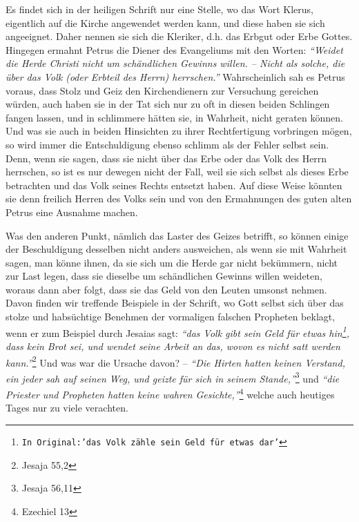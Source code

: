 Es findet sich in der heiligen Schrift nur eine Stelle, wo das Wort
Klerus,
eigentlich auf die Kirche angewendet werden kann, und diese haben sie sich
angeeignet. Daher nennen sie sich die Kleriker, d.h. das Erbgut oder Erbe
Gottes. Hingegen ermahnt Petrus die Diener des
Evangeliums mit den Worten:
\textit{"`Weidet die Herde Christi nicht um schändlichen Gewinns willen. --
Nicht
als solche, die über das Volk (oder Erbteil des Herrn) herrschen."'}
Wahrscheinlich sah es Petrus voraus, dass Stolz und Geiz den Kirchendienern zur
Versuchung gereichen würden, auch haben sie in der Tat sich nur zu oft in
diesen beiden Schlingen fangen lassen, und in schlimmere hätten sie, in
Wahrheit, nicht geraten können. Und was sie auch in beiden Hinsichten zu ihrer
Rechtfertigung vorbringen mögen, so wird immer die Entschuldigung ebenso
schlimm als der Fehler selbst sein. Denn, wenn sie sagen, dass sie nicht über
das
Erbe oder das Volk des Herrn herrschen, so ist es nur dewegen nicht der Fall,
weil sie sich selbst als dieses Erbe betrachten und das Volk seines Rechts
entsetzt haben. Auf diese Weise könnten sie denn freilich Herren des Volks sein
und von den Ermahnungen des guten alten Petrus eine Ausnahme machen.

\medskip

Was den anderen Punkt, nämlich das Laster des Geizes
betrifft, so können einige
der Beschuldigung desselben nicht anders ausweichen, als wenn sie mit Wahrheit
sagen, man könne ihnen, da sie sich um die Herde gar nicht bekümmern, nicht zur
Last legen, dass sie dieselbe um schändlichen Gewinns willen weideten, woraus
dann aber folgt, dass sie das Geld von den Leuten umsonst nehmen. Davon finden
wir treffende Beispiele in der Schrift, wo Gott selbst sich über das stolze und
habsüchtige Benehmen der vormaligen falschen Propheten beklagt, wenn er zum Beispiel
durch Jesaias sagt:
\textit{"`das Volk gibt sein Geld für etwas hin\footnote{\texttt{In
Original:'das Volk zähle sein Geld für etwas dar'}},
dass kein Brot sei,
und wendet seine Arbeit an das, wovon es nicht satt werden
kann."'}\footnote{Jesaja 55,2}
Und was war die Ursache davon? --
\textit{"`Die Hirten hatten keinen Verstand, ein
jeder sah auf seinen Weg, und geizte für sich in seinem
Stande,"'}\footnote{Jesaja 56,11}
 und
\textit{"`die Priester und Propheten hatten keine wahren
Gesichte,"'}\footnote{Ezechiel 13}
welche auch heutiges Tages nur zu viele
verachten.

